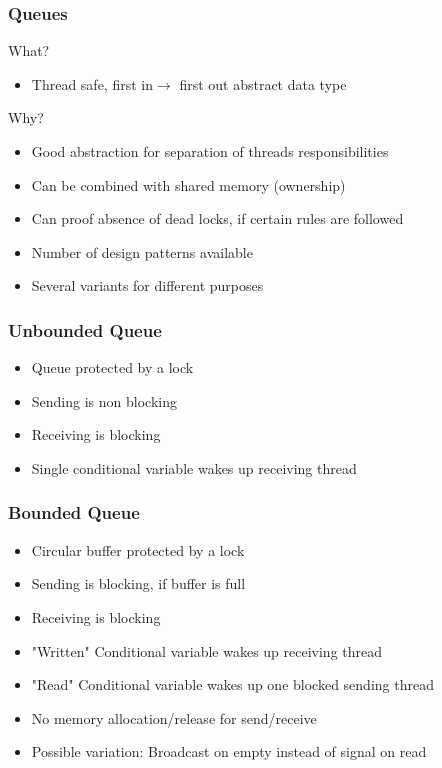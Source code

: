 \documentclass{beamer}
\begin{document}
\begin{frame}
\frametitle{Queues}
\begin{center}
 What?
\end{center}
\begin{itemize}
 \item Thread safe, first in$\to$ first out abstract data type
\end{itemize}
\begin{center}
 Why?
\end{center}
\begin{itemize}
 \item Good abstraction for separation of threads responsibilities
 \item Can be combined with shared memory (ownership)
 \item Can proof absence of dead locks, if certain rules are followed
 \item Number of design patterns available
 \item Several variants for different purposes
\end{itemize}
\end{frame}

\begin{frame}
\frametitle{Unbounded Queue}
\begin{itemize}
 \item Queue protected by a lock
 \item Sending is non blocking
 \item Receiving is blocking
 \item Single conditional variable wakes up receiving thread
\end{itemize}
\end{frame}
\begin{frame}
\frametitle{Bounded Queue}
\begin{itemize}
 \item Circular buffer protected by a lock
 \item Sending is blocking, if buffer is full
 \item Receiving is blocking
 \item "Written" Conditional variable wakes up receiving thread
 \item "Read" Conditional variable wakes up one blocked sending thread
 \item No memory allocation/release for send/receive
 \item Possible variation: Broadcast on empty instead of signal on read
\end{itemize}
\end{frame}
\end{document}
